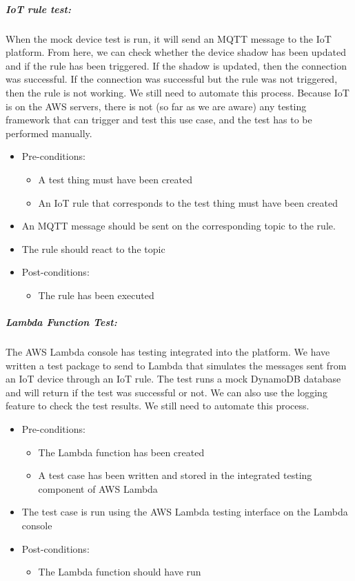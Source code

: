 \documentclass{article}
\begin{document}
				\subparagraph{IoT rule test:}
				When the mock device test is run, it will send an MQTT message to the IoT platform. From here, we can check whether the device shadow has been updated and if the rule has been triggered. If the shadow is updated, then the connection was successful. If the connection was successful but the rule was not triggered, then the rule is not working. We still need to automate this process. Because IoT is on the AWS servers, there is not (so far as we are aware) any testing framework that can trigger and test this use case, and the test has to be performed manually.
				\begin{itemize}
					\item Pre-conditions:
					\begin{itemize}
						\item A test thing must have been created
						\item An IoT rule that corresponds to the test thing must have been created
					\end{itemize}
					\item An MQTT message should be sent on the corresponding topic to the rule.
					\item The rule should react to the topic
					\item Post-conditions:
					\begin{itemize}
						\item The rule has been executed
					\end{itemize}
				\end{itemize}
				
				\subparagraph{Lambda Function Test:}
				The AWS Lambda console has testing integrated into the platform. We have written a test package to send to Lambda that simulates the messages sent from an IoT device through an IoT rule. The test runs a mock DynamoDB database and will return if the test was successful or not. We can also use the logging feature to check the test results. We still need to automate this process.
				\begin{itemize}
					\item Pre-conditions:
					\begin{itemize}
						\item The Lambda function has been created
						\item A test case has been written and stored in the integrated testing component of AWS Lambda
					\end{itemize}
					\item The test case is run using the AWS Lambda testing interface on the Lambda console
					\item Post-conditions:
					\begin{itemize}
						\item The Lambda function should have run
					\end{itemize}
				\end{itemize}
				
\end{document}
